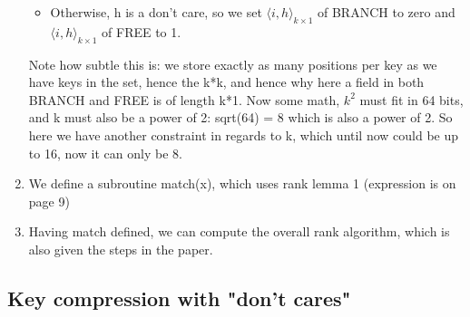 \begin{enumerate}
\begin{itemize}
        \item
        Otherwise, h is a don't care, so we set $\langle i,h\rangle_{k\times1}$ of BRANCH to zero and $\langle i,h\rangle_{k\times1}$ of FREE to 1.
    \end{itemize}
    Note how subtle this is: we store exactly as many positions per key as we have keys in the set, hence the k*k, and hence why here a field in both BRANCH and FREE is of length k*1.
    Now some math, $k^2$ must fit in 64 bits, and k must also be a power of 2: sqrt(64) = 8 which is also a power of 2. So here we have another constraint in regards to k, which until now could be up to 16, now it can only be 8.
    
    \item
    We define a subroutine match(x), which uses rank lemma 1 (expression is on page 9)
    
    \item
    Having match defined, we can compute the overall rank algorithm, which is also given the steps in the paper.
\end{enumerate}

\subsection{Key compression with "don't cares"}

